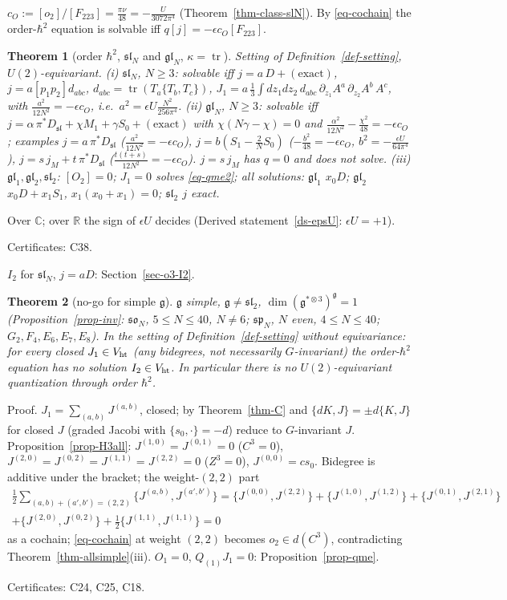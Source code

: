 \documentclass[10pt,a4paper]{article}
\numberwithin{equation}{section}
\newtheorem{theorem}{Theorem}[section]
\theoremstyle{definition}
\theoremstyle{remark}
\newcommand{\tr}{\operatorname{tr}}
\newcommand{\g}{\mathfrak g}
\newcommand{\fsl}{\mathfrak{sl}}
\newcommand{\fgl}{\mathfrak{gl}}
\newcommand{\fso}{\mathfrak{so}}
\newcommand{\fsp}{\mathfrak{sp}}
\newcommand{\Vht}{V_{\rm ht}}
\newcommand{\cert}[1]{\par\noindent\textup{Certificates: #1.}\par}
\begin{document}
$c_O:=[o_2]/[F_{223}]=\frac{\pi\nu}{48}=-\frac{U}{3072\pi^4}$ (Theorem~\ref{thm-class-slN}). By \eqref{eq-cochain} the order-$\hbar^2$ equation is solvable iff $q[j]=-\epsilon c_O[F_{223}]$.

\begin{theorem}[order $\hbar^2$, $\fsl_N$ and $\fgl_N$, $\kappa=\tr$]\label{thm-Q1}
Setting of Definition~\ref{def-setting}, $U(2)$-equivariant.
(i) $\fsl_N$, $N\ge3$: solvable iff $j=a\,D+(\text{exact})$, $j=a[p_1p_2]d_{abc}$, $d_{abc}=\tr(T_a\{T_b,T_c\})$, $J_1=a\,\frac13\int dz_1dz_2\,d_{abc}\,\partial_{z_1}A^a\,\partial_{z_2}A^b\,A^c$, with $\frac{a^2}{12N^2}=-\epsilon c_O$, i.e.\ $a^2=\epsilon U\frac{N^2}{256\pi^4}$.
(ii) $\fgl_N$, $N\ge3$: solvable iff $j=\alpha\,\pi^*D_{\fsl}+\chi M_1+\gamma S_0+(\text{exact})$ with $\chi(N\gamma-\chi)=0$ and $\frac{\alpha^2}{12N^2}-\frac{\chi^2}{48}=-\epsilon c_O$; examples $j=a\,\pi^*D_{\fsl}$ ($\frac{a^2}{12N^2}=-\epsilon c_O$), $j=b(S_1-\frac2NS_0)$ ($-\frac{b^2}{48}=-\epsilon c_O$, $b^2=-\frac{\epsilon U}{64\pi^4}$), $j=s\,j_M+t\,\pi^*D_{\fsl}$ ($\frac{t(t+s)}{12N^2}=-\epsilon c_O$). $j=s\,j_M$ has $q=0$ and does not solve.
(iii) $\fgl_1,\fgl_2,\fsl_2$: $[O_2]=0$; $J_1=0$ solves \eqref{eq-qme2}; all solutions: $\fgl_1$ $x_0D$; $\fgl_2$ $x_0D+x_1S_1$, $x_1(x_0+x_1)=0$; $\fsl_2$ $j$ exact.
\end{theorem}
Over $\mathbb C$; over $\mathbb R$ the sign of $\epsilon U$ decides (Derived statement~\ref{ds-epsU}: $\epsilon U=+1$).
\cert{C38}

$I_2$ for $\fsl_N$, $j=aD$: Section~\ref{sec-o3-I2}.

\begin{theorem}[no-go for simple $\g$]\label{thm-nogo}
$\g$ simple, $\g\neq\fsl_2$, $\dim(\g^{*\otimes3})^\g=1$ (Proposition~\ref{prop-inv}: $\fso_N$, $5\le N\le40$, $N\ne6$; $\fsp_N$, $N$ even, $4\le N\le40$; $G_2,F_4,E_6,E_7,E_8$). In the setting of Definition~\ref{def-setting} without equivariance: for every closed $J_1\in\Vht$ (any bidegrees, not necessarily $G$-invariant) the order-$\hbar^2$ equation has no solution $I_2\in\Vht$. In particular there is no $U(2)$-equivariant quantization through order $\hbar^2$.
\end{theorem}
Proof. $J_1=\sum_{(a,b)}J^{(a,b)}$, closed; by Theorem~\ref{thm-C} and $\{dK,J\}=\pm d\{K,J\}$ for closed $J$ (graded Jacobi with $\{s_0,\cdot\}=-d$) reduce to $G$-invariant $J$. Proposition~\ref{prop-H3all}: $J^{(1,0)}=J^{(0,1)}=0$ ($C^3=0$), $J^{(2,0)}=J^{(0,2)}=J^{(1,1)}=J^{(2,2)}=0$ ($Z^3=0$), $J^{(0,0)}=cs_0$. Bidegree is additive under the bracket; the weight-$(2,2)$ part
\begin{multline}
\tfrac12\!\!\sum_{(a,b)+(a',b')=(2,2)}\!\!\{J^{(a,b)},J^{(a',b')}\}=\{J^{(0,0)},J^{(2,2)}\}+\{J^{(1,0)},J^{(1,2)}\}+\{J^{(0,1)},J^{(2,1)}\}\\+\{J^{(2,0)},J^{(0,2)}\}+\tfrac12\{J^{(1,1)},J^{(1,1)}\}=0
\end{multline}
as a cochain; \eqref{eq-cochain} at weight $(2,2)$ becomes $o_2\in d(C^3)$, contradicting Theorem~\ref{thm-allsimple}(iii). $O_1=0$, $Q_{(1)}J_1=0$: Proposition~\ref{prop-qme}.
\cert{C24, C25, C18}
\end{document}
